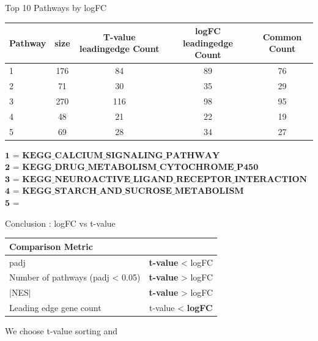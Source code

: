 \documentclass[12pt, aspectratio=43]{beamer}
\begin{document}
	
	\begin{frame}{Top 10 Pathways by logFC}
	\scriptsize
	\begin{table}[ht]
		\centering
		\renewcommand{\arraystretch}{1.1}
		\setlength{\tabcolsep}{3pt}
		\begin{tabular}{@{}lcccc@{}}
			\toprule
			\textbf{Pathway} & \textbf{size} & \textbf{T-value leadingedge Count} & \textbf{logFC leadingedge Count} & \textbf{Common Count} \\
			\midrule
			1 & 176 & 84 & 89 & 76\\
			2 & 71 & 30 & 35 & 29\\
			3 & 270 & 116 & 98 &  95\\
			4 & 48 & 21 & 22 & 19\\
			5 & 69 & 28 & 34 & 27\\
			\bottomrule
		\end{tabular}
	\end{table}
	$\textbf{1 = KEGG\_CALCIUM\_SIGNALING\_PATHWAY}$\\
	$\textbf{2 = KEGG\_DRUG\_METABOLISM\_CYTOCHROME\_P450}$\\
	$\textbf{3 = KEGG\_NEUROACTIVE\_LIGAND\_RECEPTOR\_INTERACTION}$\\
	$\textbf{4 = KEGG\_STARCH\_AND\_SUCROSE\_METABOLISM}$\\
	$\textbf{5 = KEGG\_METABOLISM\_OF\_XENOBIOTICS\_BY\_CYTOCHROME\_P450}$\\
	\end{frame}
	
	\begin{frame}{Conclusion : logFC vs t-value}
		\begin{table}[h!]
			\centering
			\begin{tabular}{lc}
				\hline
				\textbf{Comparison Metric} & \\
				\hline
				padj & \textbf{t-value} < logFC \\
				Number of pathways (padj < 0.05) & \textbf{t-value} > logFC \\
				$|$NES$|$ &\textbf{t-value} > logFC \\
				Leading edge gene count & t-value < \textbf{logFC} \\
				\hline
			\end{tabular}
		\end{table}
		We choose t-value sorting and  
	\end{frame}
	
	
	
	\begin{frame}
		\tableofcontents[currentsection,]
	\end{frame}
	
\end{document}
